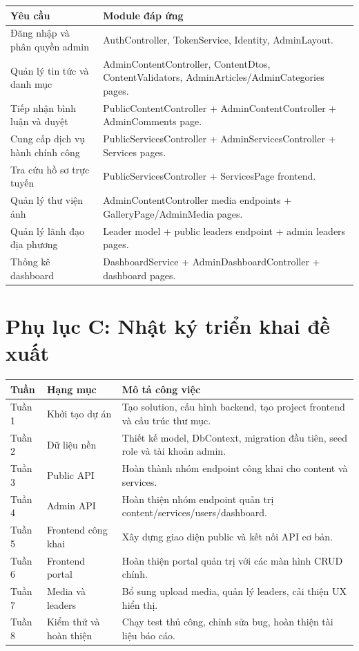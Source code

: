 \documentclass[12pt,a4paper]{article}
\begin{document}
\begin{longtable}{p{5.6cm}p{7.3cm}}
\toprule
\textbf{Yêu cầu} & \textbf{Module đáp ứng} \\
\midrule
Đăng nhập và phân quyền admin & AuthController, TokenService, Identity, AdminLayout. \\
Quản lý tin tức và danh mục & AdminContentController, ContentDtos, ContentValidators, AdminArticles/AdminCategories pages. \\
Tiếp nhận bình luận và duyệt & PublicContentController + AdminContentController + AdminComments page. \\
Cung cấp dịch vụ hành chính công & PublicServicesController + AdminServicesController + Services pages. \\
Tra cứu hồ sơ trực tuyến & PublicServicesController + ServicesPage frontend. \\
Quản lý thư viện ảnh & AdminContentController media endpoints + GalleryPage/AdminMedia pages. \\
Quản lý lãnh đạo địa phương & Leader model + public leaders endpoint + admin leaders pages. \\
Thống kê dashboard & DashboardService + AdminDashboardController + dashboard pages. \\
\bottomrule
\end{longtable}

\section*{Phụ lục C: Nhật ký triển khai đề xuất}

\begin{longtable}{p{2.3cm}p{4.4cm}p{6.2cm}}
\toprule
\textbf{Tuần} & \textbf{Hạng mục} & \textbf{Mô tả công việc} \\
\midrule
Tuần 1 & Khởi tạo dự án & Tạo solution, cấu hình backend, tạo project frontend và cấu trúc thư mục. \\
Tuần 2 & Dữ liệu nền & Thiết kế model, DbContext, migration đầu tiên, seed role và tài khoản admin. \\
Tuần 3 & Public API & Hoàn thành nhóm endpoint công khai cho content và services. \\
Tuần 4 & Admin API & Hoàn thiện nhóm endpoint quản trị content/services/users/dashboard. \\
Tuần 5 & Frontend công khai & Xây dựng giao diện public và kết nối API cơ bản. \\
Tuần 6 & Frontend portal & Hoàn thiện portal quản trị với các màn hình CRUD chính. \\
Tuần 7 & Media và leaders & Bổ sung upload media, quản lý leaders, cải thiện UX hiển thị. \\
Tuần 8 & Kiểm thử và hoàn thiện & Chạy test thủ công, chỉnh sửa bug, hoàn thiện tài liệu báo cáo. \\
\bottomrule
\end{longtable}
\end{document}

